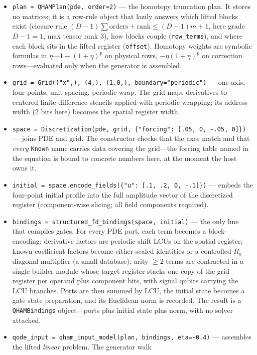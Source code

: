 \begin{itemize}
\item \texttt{plan = QHAMPlan(pde, order=2)} --- the homotopy truncation
  plan.  It stores no matrices; it is a row-rule object that lazily answers
  which lifted blocks exist (closure rule $(D{-}1)\sum \text{orders} +
  \text{rank} \le (D{-}1)m{+}1$, here grade $D{-}1{=}1$, max tensor rank
  $3$), how blocks couple (\texttt{row\_terms}), and where each block sits
  in the lifted register (\texttt{offset}).  Homotopy weights are symbolic
  formulas in $\eta$---$1{-}(1{+}\eta)^p$ on physical rows,
  $-\eta(1{+}\eta)^p$ on correction rows---evaluated only when the
  generator is assembled.
\item \texttt{grid = Grid(("x",), (4,), (1.0,), boundary="periodic")} ---
  one axis, four points, unit spacing, periodic wrap.  The grid maps
  derivatives to centered finite-difference stencils applied with periodic
  wrapping; its address width (2 bits here) becomes the spatial register
  width.
\item \texttt{space = Discretization(pde, grid, \{"forcing": [.05, 0,
  -.05, 0]\})} --- joins PDE and grid.  The constructor checks that the
  axes match and that \emph{every} \texttt{Known} name carries data
  covering the grid---the forcing table named in the equation is bound to
  concrete numbers here, at the moment the host owns it.
\item \texttt{initial = space.encode\_fields(\{"u": [.1, .2, 0, -.1]\})}
  --- embeds the four-point initial profile into the full amplitude vector
  of the discretized register (component-wise slicing; all field
  components required).
\item \texttt{bindings = structured\_fd\_bindings(space, initial)} --- the
  only line that compiles gates.  For every PDE port, each term becomes a
  block-encoding: derivative factors are periodic-shift LCUs on the
  spatial register; known-coefficient factors become either scaled
  identities or a controlled-$R_y$ diagonal multiplier (a small database);
  arity-$\ge 2$ terms are contracted in a single builder module whose
  target register stacks one copy of the grid register per operand plus
  component bits, with signal qubits carrying the LCU branches.  Ports are
  then summed by LCU, the initial state becomes a gate state preparation,
  and its Euclidean norm is recorded.  The result is a
  \texttt{QHAMBindings} object---ports plus initial state plus norm, with
  no solver attached.
\item \texttt{qode\_input = qham\_input\_model(plan, bindings, eta=-0.4)}
  --- assembles the lifted \emph{linear} problem.  The generator walk

\end{itemize}
